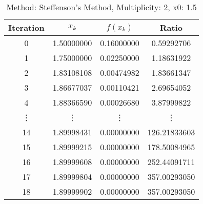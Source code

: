 \begin{table}
\centering
\caption{Method: Steffenson's Method, Multiplicity: 2, x0: 1.5}
\label{tab:table_Steffenson's_Method_2_1_5}
\begin{tabular}{c c c c}
\toprule
Iteration &      $x_k$ &   $f(x_k)$ &        Ratio \\
\midrule
        0 & 1.50000000 & 0.16000000 &   0.59292706 \\
        1 & 1.75000000 & 0.02250000 &   1.18631922 \\
        2 & 1.83108108 & 0.00474982 &   1.83661347 \\
        3 & 1.86677037 & 0.00110421 &   2.69654052 \\
        4 & 1.88366590 & 0.00026680 &   3.87999822 \\
   \vdots &     \vdots &     \vdots &       \vdots \\
       14 & 1.89998431 & 0.00000000 & 126.21833603 \\
       15 & 1.89999215 & 0.00000000 & 178.50084965 \\
       16 & 1.89999608 & 0.00000000 & 252.44091711 \\
       17 & 1.89999804 & 0.00000000 & 357.00293050 \\
       18 & 1.89999902 & 0.00000000 & 357.00293050 \\
\bottomrule
\end{tabular}
\end{table}
